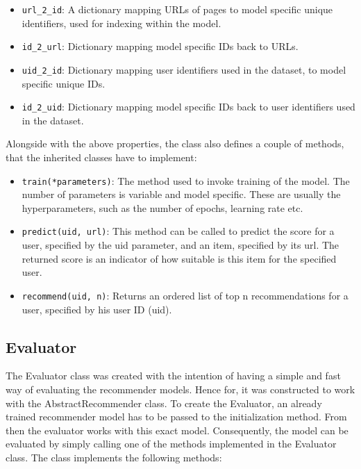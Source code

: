 \begin{itemize}
    \item \texttt{url\_2\_id}: A dictionary mapping URLs of pages to model specific unique identifiers, used for indexing within the model. 
    \item \texttt{id\_2\_url}: Dictionary mapping model specific IDs back to URLs.

    \item \texttt{uid\_2\_id}: Dictionary mapping user identifiers used in the dataset, to model specific unique IDs.

    \item \texttt{id\_2\_uid}: Dictionary mapping model specific IDs back to user identifiers used in the dataset.

\end{itemize}
Alongside with the above properties, the class also defines a couple of methods, that the inherited classes have to implement:
\begin{itemize}
    \item \texttt{train(*parameters)}: The method used to invoke training of the model. The number of parameters is variable and model specific. These are usually the hyperparameters, such as the number of epochs, learning rate etc. 
    
    \item \texttt{predict(uid, url)}: This method can be called to predict the score for a user, specified by the uid parameter, and an item, specified by its url. The returned score is an indicator of how suitable is this item for the specified user.
    
    \item \texttt{recommend(uid, n)}: Returns an ordered list of top n recommendations for a user, specified by his user ID (uid).
\end{itemize}

\subsection*{Evaluator}
The Evaluator class was created with the intention of having a simple and fast way of evaluating the recommender models. Hence for, it was constructed to work with the AbstractRecommender class. To create the Evaluator, an already trained recommender model has to be passed to the initialization method. From then the evaluator works with this exact model. Consequently, the model can be evaluated by simply calling one of the methods implemented in the Evaluator class. The class implements the following methods:

